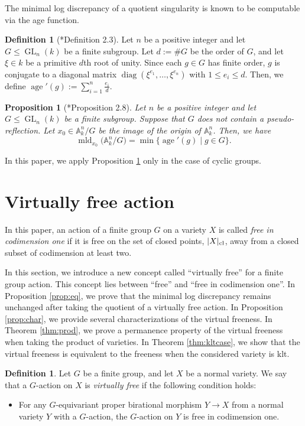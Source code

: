 \documentclass[a4paper,11pt]{amsart}
\newtheorem{prop}[thm]{Proposition}
\theoremstyle{definition}
\newtheorem{defi}[thm]{Definition}
\theoremstyle{remark}
\begin{document}
The minimal log discrepancy of a quotient singularity is known to be computable via the age function. 
\begin{defi}[\cite{NSs}*{Definition 2.3}]\label{defi:age}
Let $n$ be a positive integer and 
let $G \leqslant \operatorname{GL}_{n}(k)$ be a finite subgroup. 
Let $d := \# G$ be the order of $G$, and let $\xi \in k$ be a primitive $d$th root of unity. 
Since each $g \in G$ has finite order, $g$ is conjugate to a diagonal matrix $\operatorname{diag}(\xi ^{e_1}, \ldots , \xi ^{e_n})$ 
with $1 \le e_i \le d$. 
Then, we define $\operatorname{age}'(g) := \sum _{i = 1} ^n \frac{e_i}{d}$. 
\end{defi}
\begin{prop}[\cite{NSs}*{Proposition 2.8}]\label{prop:age}
Let $n$ be a positive integer and 
let $G \leqslant \operatorname{GL}_{n}(k)$ be a finite subgroup. 
Suppose that $G$ does not contain a pseudo-reflection. 
Let $x_0 \in \mathbb{A}^n_k / G$ be the image of the origin of $\mathbb{A}^n _k$. 
Then, we have
\[
\operatorname{mld}_{x_0} \bigl( \mathbb{A}^n_k / G \bigr) = \min \{ \operatorname{age}'(g) \mid g \in G \}.
\]
\end{prop}
\noindent
In this paper, we apply Proposition \ref{prop:age} only in the case of cyclic groups.


\section{Virtually free action}\label{section:ef}
In this paper, an action of a finite group $G$ on a variety $X$ is called \textit{free in codimension one} 
if it is free on the set of closed points, $|X|_{\rm cl}$, away from a closed subset of codimension at least two.

In this section, we introduce a new concept called ``virtually free'' for a finite group action. 
This concept lies between ``free'' and ``free in codimension one''. 
In Proposition \ref{prop:eq}, we prove that the minimal log discrepancy remains unchanged after taking the quotient of a virtually free action. 
In Proposition \ref{prop:char}, we provide several characterizations of the virtual freeness. 
In Theorem \ref{thm:prod}, we prove a permanence property of the virtual freeness when taking the product of varieties. 
In Theorem \ref{thm:kltcase}, we show that the virtual freeness is equivalent to the freeness when the considered variety is klt. 

\begin{defi}\label{defi:ess}
Let $G$ be a finite group, and let $X$ be a normal variety. 
We say that a $G$-action on $X$ is \textit{virtually free} if the following condition holds: 
\begin{itemize}
\item 
For any $G$-equivariant proper birational morphism $Y \to X$ from a normal variety $Y$ with a $G$-action, 
the $G$-action on $Y$ is free in codimension one. 
\end{itemize}
\end{defi}
\end{document}
